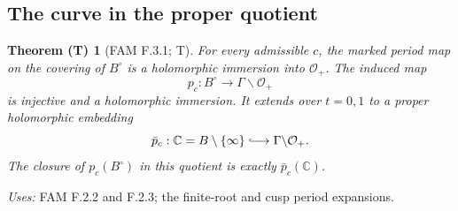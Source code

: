 \documentclass[11pt,a4paper]{article}
\theoremstyle{plain}
\newtheorem{theorem}{Theorem (T)}[section]
\theoremstyle{definition}
\begin{document}
\subsection{The curve in the proper quotient}
\begin{theorem}[FAM F.3.1; T]\label{fam:F.3.1}
For every admissible $c$, the marked period map on the covering of
$B^\circ$ is a holomorphic immersion into $\mathcal O_+$.  The induced
map
\[
 p_c:B^\circ\longrightarrow\Gamma\backslash\mathcal O_+
\]
is injective and a holomorphic immersion.  It extends over $t=0,1$ to a
proper holomorphic embedding
\[
 \bar p_c:\mathbb C=B\setminus\{\infty\}
 \lhook\joinrel\longrightarrow\Gamma\backslash\mathcal O_+.
\]
The closure of $p_c(B^\circ)$ in this quotient is exactly
$\bar p_c(\mathbb C)$.
\end{theorem}
\noindent\emph{Uses:} FAM F.2.2 and F.2.3; the finite-root and cusp period expansions.\par
\end{document}
